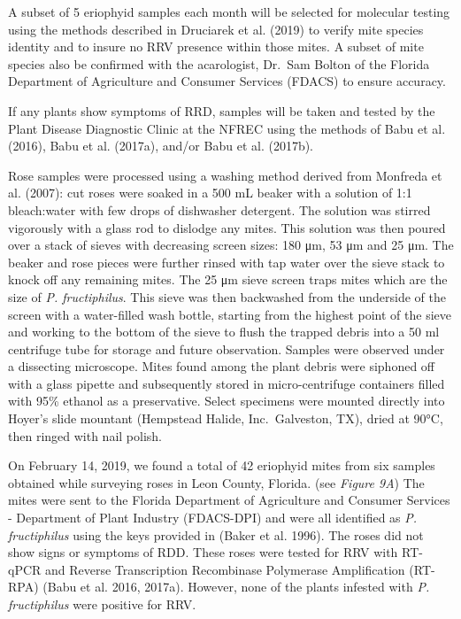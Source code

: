 \documentclass[12pt,final,CPage]{ufthesis}
\begin{document}
{  A subset of 5 eriophyid samples each month will be selected for molecular testing using the methods described in Druciarek et al. (2019) to verify mite species identity and to insure no RRV presence within those mites. A subset of mite species also be confirmed with the acarologist, Dr.~Sam Bolton of the Florida Department of Agriculture and Consumer Services (FDACS) to ensure accuracy.

  If any plants show symptoms of RRD, samples will be taken and tested by the Plant Disease Diagnostic Clinic at the NFREC using the methods of Babu et al. (2016), Babu et al. (2017a), and/or Babu et al. (2017b).

  Rose samples were processed using a washing method derived from Monfreda et al. (2007): cut roses were soaked in a 500 mL beaker with a solution of 1:1 bleach:water with few drops of dishwasher detergent. The solution was stirred vigorously with a glass rod to dislodge any mites. This solution was then poured over a stack of sieves with decreasing screen sizes: 180 \si{\micro\metre}, 53 \si{\micro\metre} and 25 \si{\micro\metre}.
  The beaker and rose pieces were further rinsed with tap water over the sieve stack to knock off any remaining mites. The 25 \si{\micro\metre} sieve screen traps mites which are the size of \emph{P. fructiphilus}. This sieve was then backwashed from the underside of the screen with a water-filled wash bottle, starting from the highest point of the sieve and working to the bottom of the sieve to flush the trapped debris into a 50 ml centrifuge tube for storage and future observation. Samples were observed under a dissecting microscope. Mites found among the plant debris were siphoned off with a glass pipette and subsequently stored in micro-centrifuge containers filled with 95\% ethanol as a preservative. Select specimens were mounted directly into Hoyer's slide mountant (Hempstead Halide, Inc.~Galveston, TX), dried at 90°C, then ringed with nail polish.

  On February 14, 2019, we found a total of 42 eriophyid mites from six samples obtained while surveying roses in Leon County, Florida. (see \emph{Figure 9A}) The mites were sent to the Florida Department of Agriculture and Consumer Services - Department of Plant Industry (FDACS-DPI) and were all identified as \emph{P. fructiphilus} using the keys provided in (Baker et al. 1996). The roses did not show signs or symptoms of RDD. These roses were tested for RRV with RT-qPCR and Reverse Transcription Recombinase Polymerase Amplification (RT-RPA) (Babu et al. 2016, 2017a). However, none of the plants infested with \emph{P. fructiphilus} were positive for RRV.

}
\end{document}
